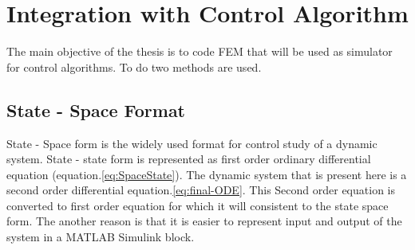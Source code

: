 \documentclass[main.tex]{subfiles}
\begin{document}

 











\section{Integration with Control Algorithm}
The main objective of the thesis is to code FEM that will be used as simulator for control algorithms. To do two methods are used. 

\subsection{State - Space Format}

State - Space form is the widely used format for control study of a dynamic system. State - state form is represented as first order ordinary differential equation (equation.\ref{eq:SpaceState}). The dynamic system that is present here is a second order differential equation.\ref{eq:final-ODE}. This Second order equation is converted to first order equation for which it will consistent to the  state space form. The another reason is that it is easier to represent input and output of the system in a MATLAB Simulink block.  
\end{document}
